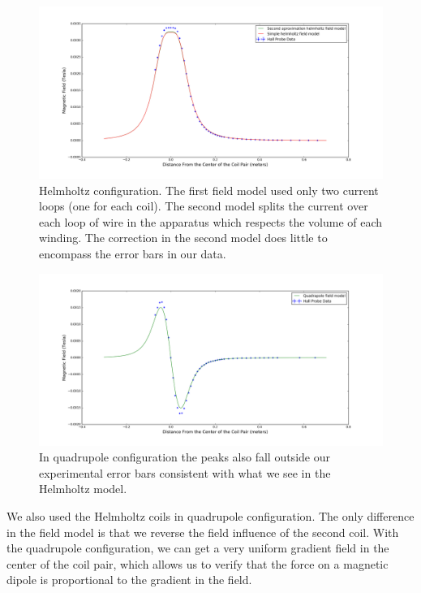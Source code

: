 \documentclass[aps,twocolumn,secnumarabic,balancelastpage,amsmath,amssymb,nofootinbib,floatfix]{revtex4-1}
\begin{document}
\begin{figure}[here]
\includegraphics[width=.97\textwidth]{../DataValidation/helmholtzPlot.png}
\caption{Helmholtz configuration. The first field model used only two current loops (one for each coil). The second model splits the current over each loop of wire in the apparatus which respects the volume of each winding. The correction in the second model does little to encompass the error bars in our data.}
\label{helmPlot}
\end{figure}


\begin{figure}[here]
\includegraphics[width=.97\textwidth]{../DataValidation/quadPlot.png}
\caption{In quadrupole configuration the peaks also fall outside our experimental error bars consistent with what we see in the Helmholtz model.}
\label{quadPlot}
\end{figure}

We also used the Helmholtz coils in quadrupole configuration. The only difference in the field model is that we reverse the field influence of the second coil. With the quadrupole configuration, we can get a very uniform gradient field in the center of the coil pair, which allows us to verify that the force on a magnetic dipole is proportional to the gradient in the field. 
\end{document}
